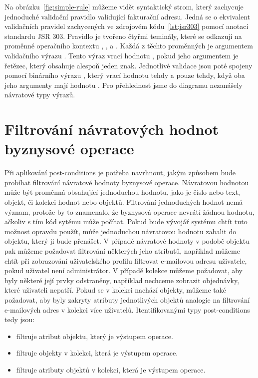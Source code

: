 Na obrázku~\ref{fig:simple-rule} můžeme vidět syntaktický strom, který zachycuje jednoduché
validační pravidlo validující fakturační adresu. Jedná se o ekvivalent validačních pravidel
zachycených ve zdrojovém kódu~\ref{lst:jsr303} pomocí anotací standardu \gls{JSR} 303.
Pravidlo je tvořeno čtyřmi teminály, které se odkazují na proměnné operačního kontextu ,
,  a . Každá z těchto proměnných je argumentem validačního výrazu
. Tento výraz vrací hodnotu , pokud jeho argumentem je řetězec, který obsahuje
alespoň jeden znak. Jednotlivé validace jsou poté spojeny pomocí binárního výrazu ,
který vrací hodnotu  tehdy a pouze tehdy, když oba jeho argumenty mají hodnotu .
Pro přehlednost jsme do diagramu nezanášely návratové typy výrazů.

\section{Filtrování návratových hodnot byznysové operace}

Při aplikování post-conditions je potřeba navrhnout, jakým způsobem bude probíhat filtrování
návratové hodnoty byznysové operace. Návratovou hodnotou může být proměnná obsahující jednoduchou
hodnotu, jako je číslo nebo text, objekt, či kolekci hodnot nebo objektů. Filtrování jednoduchých
hodnot nemá význam, protože by to znamenalo, že byznysová operace nevrátí žádnou hodnotu, ačkoliv
s tím kód sytému může počítat. Pokud bude vývojář systému chtít tuto možnost opravdu použít, může
jednoduchou návratovou hodnotu zabalit do objektu, který ji bude přenášet.
V případě návratové hodnoty v podobě objektu pak můžeme požadovat filtrování některých jeho atributů,
například můžeme chtít při zobrazování uživatelského profilu filtrovat e-mailovou adresu uživatele,
pokud uživatel není administrátor. V případě kolekce můžeme požadovat, aby byly některé její prvky odstraněny,
například nechceme zobrazit objednávky, které uživateli nepatří. Pokud se v kolekci nachází objekty, můžeme
také požadovat, aby byly zakryty atributy jednotlivých objektů \textendash\xspace analogie na filtrování e-mailových
adres v kolekci více uživatelů. Itentifikovanými typy post-conditions tedy jsou:

\begin{itemize}
    \item {} filtruje atribut objektu, který je výstupem operace.
    \item {} filtruje objekty v kolekci, která je výstupem operace.
    \item {} filtruje atributy objektů v kolekci, která je výstupem operace.
\end{itemize}

